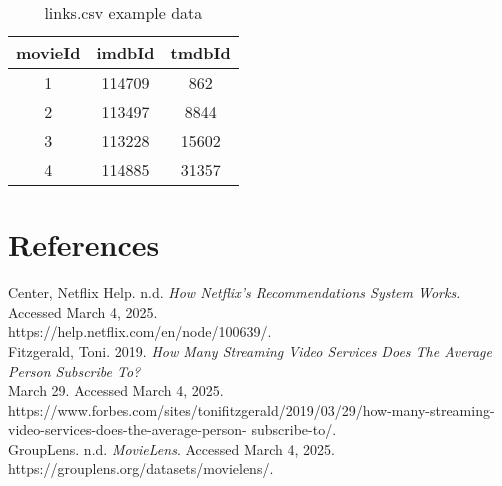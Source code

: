 \documentclass[11pt]{article}
\begin{document}
\begin{table}[h!]
  \centering
  \begin{tabular}{|c|c|c|}
    \hline
    movieId & imdbId & tmdbId \\ \hline
    1       & 114709 & 862    \\ \hline
    2       & 113497 & 8844   \\ \hline
    3       & 113228 & 15602  \\ \hline
    4       & 114885 & 31357  \\ \hline
  \end{tabular}
  \caption{links.csv example data}
\end{table}

\section*{References}
Center, Netflix Help. n.d. \textit{How Netflix's Recommendations System Works.} Accessed March 4, 2025. \\
\indent https://help.netflix.com/en/node/100639/. \\
Fitzgerald, Toni. 2019. \textit{How Many Streaming Video Services Does The Average Person Subscribe To?} \\
\indent March 29. Accessed March 4, 2025. \\
\indent https://www.forbes.com/sites/tonifitzgerald/2019/03/29/how-many-streaming-video-services-does-the-average-person-
\indent subscribe-to/. \\
GroupLens. n.d. \textit{MovieLens}. Accessed March 4, 2025. \\
\indent https://grouplens.org/datasets/movielens/.
\end{document}
